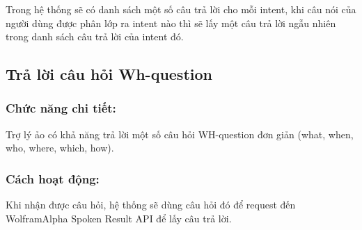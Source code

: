 Trong hệ thống sẽ có danh sách một số câu trả lời cho mỗi intent, khi câu nói của người dùng được phân lớp ra intent nào thì sẽ lấy một câu trả lời ngẫu nhiên trong danh sách câu trả lời của intent đó.

\subsection{Trả lời câu hỏi Wh-question}

\subsubsection{Chức năng chi tiết:}

Trợ lý ảo có khả năng trả lời một số câu hỏi WH-question đơn giản (what, when, who, where, which, how).

\subsubsection{Cách hoạt động:}

Khi nhận được câu hỏi, hệ thống sẽ dùng câu hỏi đó để request đến WolframAlpha Spoken Result API để lấy câu trả lời.
